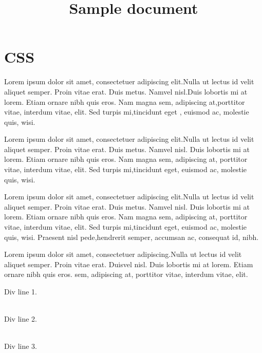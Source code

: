 \documentclass{article}
\title{Sample document}
\begin{document}
\maketitle
 
\section*{CSS}
 
\par Lorem ipsum dolor sit amet, consectetuer adipiscing elit.Nulla ut lectus id velit aliquet semper. Proin vitae erat. Duis metus. Namvel nisl.Duis lobortis mi at lorem. Etiam ornare nibh quis eros. Nam magna sem, adipiscing at,porttitor vitae, interdum vitae, elit. Sed turpis mi,tincidunt eget , euismod ac, molestie quis, wisi.

\par Lorem ipsum dolor sit amet, consectetuer adipiscing elit.Nulla ut lectus id velit aliquet semper. Proin vitae erat. Duis metus. Namvel nisl. Duis lobortis mi at lorem. Etiam ornare nibh quis eros. Nam magna sem, adipiscing at, porttitor vitae, interdum vitae, elit. Sed turpis mi,tincidunt eget, euismod ac, molestie quis, wisi.

\par Lorem ipsum dolor sit amet, consectetuer adipiscing elit.Nulla ut lectus id velit aliquet semper. Proin vitae erat. Duis metus. Namvel nisl. Duis lobortis mi at lorem. Etiam ornare nibh quis eros. Nam magna sem, adipiscing at, porttitor vitae, interdum vitae, elit. Sed turpis mi,tincidunt eget, euismod ac, molestie quis, wisi. Praesent nisl pede,hendrerit semper, accumsan ac, consequat id, nibh.

\par Lorem ipsum dolor sit amet, consectetuer adipiscing.Nulla ut lectus id velit aliquet semper. Proin vitae erat. Duisvel nisl. Duis lobortis mi at lorem. Etiam ornare nibh quis eros. sem, adipiscing at, porttitor vitae, interdum vitae, elit.
 \\ 
\par Div line 1. 
 \\ 
 \\ 
\par Div line 2. 
 \\ 
 \\ 
\par Div line 3.
 \\ 
 \\ 
  
\end{document}
